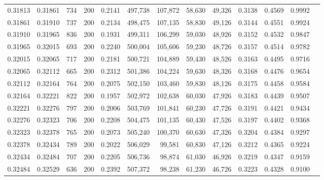 \begin{tabular}{rrrrrrrrrrrrr}
0.31813 & 0.31861 &   734 & 200 &                                     0.2141 & 497,738 & 107,872 &  58,630 &  49,326 & 0.3138 & 0.4569 & 0.9992 \\
0.31861 & 0.31910 &   737 & 200 &                                     0.2134 & 498,475 & 107,135 &  58,830 &  49,126 & 0.3144 & 0.4551 & 0.9924 \\
0.31910 & 0.31965 &   836 & 200 &                                     0.1931 & 499,311 & 106,299 &  59,030 &  48,926 & 0.3152 & 0.4532 & 0.9847 \\
0.31965 & 0.32015 &   693 & 200 &                                     0.2240 & 500,004 & 105,606 &  59,230 &  48,726 & 0.3157 & 0.4514 & 0.9782 \\
0.32015 & 0.32065 &   717 & 200 &                                     0.2181 & 500,721 & 104,889 &  59,430 &  48,526 & 0.3163 & 0.4495 & 0.9716 \\
0.32065 & 0.32112 &   665 & 200 &                                     0.2312 & 501,386 & 104,224 &  59,630 &  48,326 & 0.3168 & 0.4476 & 0.9654 \\
0.32112 & 0.32164 &   764 & 200 &                                     0.2075 & 502,150 & 103,460 &  59,830 &  48,126 & 0.3175 & 0.4458 & 0.9584 \\
0.32164 & 0.32221 &   822 & 200 &                                     0.1957 & 502,972 & 102,638 &  60,030 &  47,926 & 0.3183 & 0.4439 & 0.9507 \\
0.32221 & 0.32276 &   797 & 200 &                                     0.2006 & 503,769 & 101,841 &  60,230 &  47,726 & 0.3191 & 0.4421 & 0.9434 \\
0.32276 & 0.32323 &   706 & 200 &                                     0.2208 & 504,475 & 101,135 &  60,430 &  47,526 & 0.3197 & 0.4402 & 0.9368 \\
0.32323 & 0.32378 &   765 & 200 &                                     0.2073 & 505,240 & 100,370 &  60,630 &  47,326 & 0.3204 & 0.4384 & 0.9297 \\
0.32378 & 0.32434 &   789 & 200 &                                     0.2022 & 506,029 &  99,581 &  60,830 &  47,126 & 0.3212 & 0.4365 & 0.9224 \\
0.32434 & 0.32484 &   707 & 200 &                                     0.2205 & 506,736 &  98,874 &  61,030 &  46,926 & 0.3219 & 0.4347 & 0.9159 \\
0.32484 & 0.32529 &   636 & 200 &                                     0.2392 & 507,372 &  98,238 &  61,230 &  46,726 & 0.3223 & 0.4328 & 0.9100 \\

\end{tabular}

